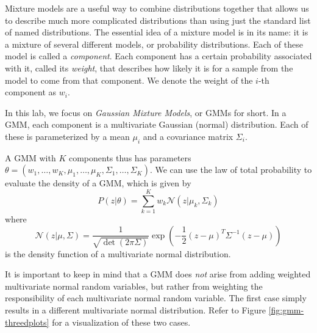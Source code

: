 Mixture models are a useful way to combine distributions together that allows us to describe much more complicated distributions than using just the standard list of named distributions.
The essential idea of a mixture model is in its name: it is a mixture of several different models, or probability distributions.
Each of these model is called a \emph{component}.
Each component has a certain probability associated with it, called its \emph{weight}, that describes how likely it is for a sample from the model to come from that component.
We denote the weight of the \(i\)-th component as \(w_i\).

In this lab, we focus on \emph{Gaussian Mixture Models}, or GMMs for short.
In a GMM, each component is a multivariate %
 Gaussian (normal) distribution.
Each of these is parameterized by a mean \(\mu_i\) and a covariance matrix \(\Sigma_i\).

A GMM with \(K\) components thus has parameters \(\theta = \left(w_1,\ldots,w_K, \mu_1,\ldots,\mu_K,\Sigma_1,\ldots,\Sigma_K\right)
\).
We can use the law of total probability to evaluate the density of a GMM, which is given by 
\[
P(z | \theta) = \sum_{k=1}^{K} w_{k} \mathcal{N}(z | \mu_{k}, \Sigma_{k})
\]
where
\[
\mathcal{N}(z | \mu, \Sigma) = \frac{1}{\sqrt{\det(2\pi\Sigma)}} \exp\left({-\frac{1}{2} \left(z - \mu \right)^{T} \Sigma^{-1} \left(z - \mu\right)}\right)
\]
is the density function of a multivariate normal distribution.

It is important to keep in mind that a GMM does \emph{not} arise from adding weighted multivariate normal random variables, but rather from weighting the responsibility of each multivariate normal random variable. 
The first case simply results in a different multivariate normal distribution. %
Refer to Figure \ref{fig:gmm-threedplots} for a visualization of these two cases.


